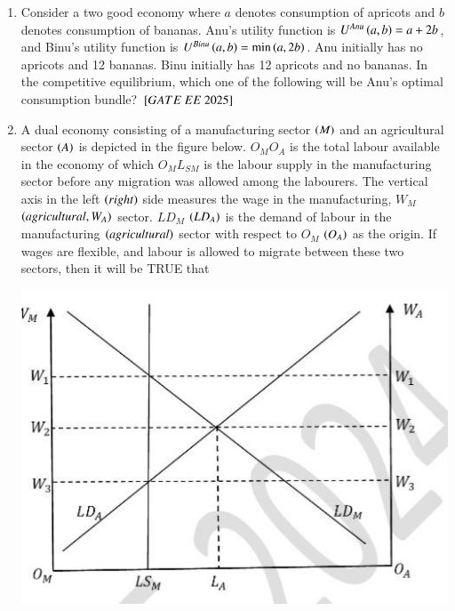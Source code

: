 \documentclass[journal,12pt,onecolumn]{IEEEtran}
\theoremstyle{remark}
\begin{document}
\begin{enumerate}
\item Consider a two good economy where $a$ denotes consumption of apricots and $b$ denotes consumption of bananas. Anu's utility function is $U^{Anu} \left(a, b\right) = a + 2b$, and Binu's utility function is $U^{Binu} \left(a, b\right) = \min \left(a, 2b\right)$. Anu initially has no apricots and 12 bananas. Binu initially has 12 apricots and no bananas. In the competitive equilibrium, which one of the following will be Anu's optimal consumption bundle?
\hfill $\sbrak{GATE\ EE\ 2025}$
\begin{enumerate}
\end{enumerate}
 
\item A dual economy consisting of a manufacturing sector  $\left(M\right)$ and an agricultural sector  $\left(A\right)$ is depicted in the figure below. $O_M O_A$ is the total labour available in the economy of which $O_M L_{SM}$ is the labour supply in the manufacturing sector before any migration was allowed among the labourers. The vertical axis in the left  $\left(right\right)$ side measures the wage in the manufacturing, $W_M$  $\left(agricultural, W_A\right)$ sector. $LD_M$  $\left(LD_A\right)$ is the demand of labour in the manufacturing  $\left(agricultural\right)$ sector with respect to $O_M$  $\left(O_A\right)$ as the origin. If wages are flexible, and labour is allowed to migrate between these two sectors, then it will be TRUE that

\includegraphics[scale=0.5]{figs/graph.jpg}


\end{enumerate}
\end{document}

